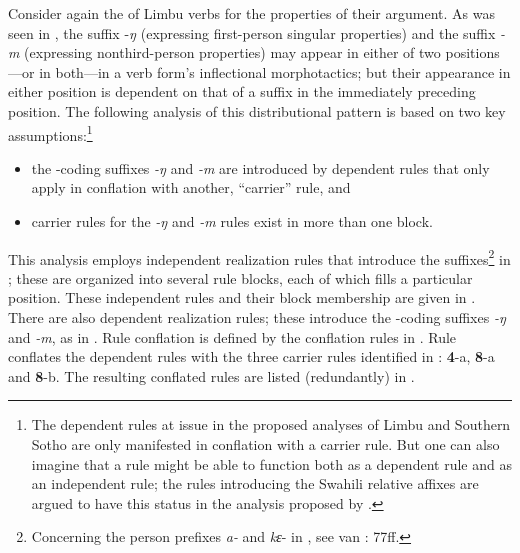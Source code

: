 \documentclass[output=paper,
modfonts
]{LSP/langsci}
\begin{document}
Consider again the  of Limbu verbs for the properties of their  argument.  As was seen in , the suffix \nobreakdash-\textit{ŋ} (expressing first\nobreakdash-person singular  properties) and the suffix \textit{\nobreakdash-m} (expressing nonthird\nobreakdash-person   properties) may appear in either of two positions—or in both—in a verb form’s inflectional morphotactics; but their appearance in either position is dependent on that of a suffix in the immediately preceding position.  The following analysis of this distributional pattern is based on two key assumptions:\footnote{ The dependent rules at issue in the proposed analyses of Limbu and Southern Sotho are only manifested in conflation with a carrier rule.  But one can also imagine that a rule might be able to function both as a dependent rule and as an independent rule; the rules introducing the Swahili relative affixes are argued to have this status in the analysis proposed by \citet{stump}.}

\begin{itemize}
\item 
the \nobreakdash-coding suffixes \textit{\nobreakdash-ŋ} and \textit{\nobreakdash-m} are introduced by dependent rules that only apply in conflation with another, “carrier” rule, and
\item 
carrier rules for the \textit{\nobreakdash-ŋ} and \textit{\nobreakdash-m} rules exist in more than one block.  
\end{itemize}

This analysis employs independent realization rules that introduce the suffixes\footnote{Concerning the person prefixes \textit{a\nobreakdash-} and \textit{kε}\nobreakdash- in , see van \citealt{Driem1987}: 77ff.} in ; these are organized into several rule blocks, each of which fills a particular  position.  These independent rules and their block membership are given in .  There are also dependent realization rules; these introduce the \nobreakdash-coding suffixes \textit{\nobreakdash-ŋ} and \textit{\nobreakdash-m}, as in .  Rule conflation is defined by the conflation rules in .  Rule  conflates the dependent rules with the three carrier rules identified in :  \textbf{4}\nobreakdash-a, \textbf{8}\nobreakdash-a and \textbf{8}\nobreakdash-b.  The resulting conflated rules are listed (redundantly) in .  
\end{document}
